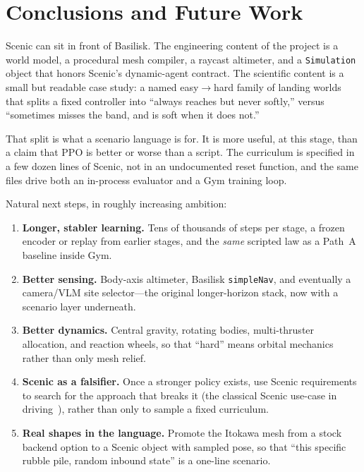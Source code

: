 \documentclass[10pt]{article}
\begin{document}
\section{Conclusions and Future Work}
\label{sec:concl}

Scenic can sit in front of Basilisk.
The engineering content of the project is a world model, a procedural mesh compiler, a raycast altimeter, and a \texttt{Simulation} object that honors Scenic's dynamic-agent contract.
The scientific content is a small but readable case study: a named easy$\to$hard family of landing worlds that splits a fixed controller into ``always reaches but never softly,'' versus ``sometimes misses the band, and is soft when it does not.''

That split is what a scenario language is for.
It is more useful, at this stage, than a claim that PPO is better or worse than a script.
The curriculum is specified in a few dozen lines of Scenic, not in an undocumented reset function, and the same files drive both an in-process evaluator and a Gym training loop.

Natural next steps, in roughly increasing ambition:
\begin{enumerate}[leftmargin=1.4em,itemsep=3pt]
  \item \textbf{Longer, stabler learning.}
    Tens of thousands of steps per stage, a frozen encoder or replay from earlier stages, and the \emph{same} scripted law as a Path~A baseline inside Gym.
  \item \textbf{Better sensing.}
    Body-axis altimeter, Basilisk \texttt{simpleNav}, and eventually a camera/VLM site selector---the original longer-horizon stack, now with a scenario layer underneath.
  \item \textbf{Better dynamics.}
    Central gravity, rotating bodies, multi-thruster allocation, and reaction wheels, so that ``hard'' means orbital mechanics rather than only mesh relief.
  \item \textbf{Scenic as a falsifier.}
    Once a stronger policy exists, use Scenic requirements to search for the approach that breaks it (the classical Scenic use-case in driving~\citep{fremont2022scenic}), rather than only to sample a fixed curriculum.
  \item \textbf{Real shapes in the language.}
    Promote the Itokawa mesh from a stock backend option to a Scenic object with sampled pose, so that ``this specific rubble pile, random inbound state'' is a one-line scenario.
\end{enumerate}
\end{document}
